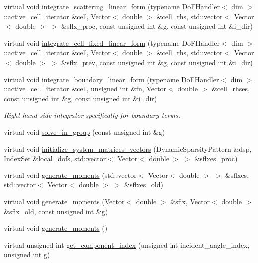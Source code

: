\begin{DoxyCompactItemize}
virtual void \hyperlink{class_equation_base_aca5998c1afd2b89ee93d3fbbfde7f3d0}{integrate\+\_\+scattering\+\_\+linear\+\_\+form} (typename Do\+F\+Handler$<$ dim $>$\+::active\+\_\+cell\+\_\+iterator \&cell, Vector$<$ double $>$ \&cell\+\_\+rhs, std\+::vector$<$ Vector$<$ double $>$ $>$ \&sflx\+\_\+proc, const unsigned int \&g, const unsigned int \&i\+\_\+dir)
\item 
virtual void \hyperlink{class_equation_base_ae8472f5c20d76c7d01e5660f8377887e}{integrate\+\_\+cell\+\_\+fixed\+\_\+linear\+\_\+form} (typename Do\+F\+Handler$<$ dim $>$\+::active\+\_\+cell\+\_\+iterator \&cell, Vector$<$ double $>$ \&cell\+\_\+rhs, std\+::vector$<$ Vector$<$ double $>$ $>$ \&sflx\+\_\+prev, const unsigned int \&g, const unsigned int \&i\+\_\+dir)
\item 
virtual void \hyperlink{class_equation_base_a1a213c4e21984bead9146e50be97077f}{integrate\+\_\+boundary\+\_\+linear\+\_\+form} (typename Do\+F\+Handler$<$ dim $>$\+::active\+\_\+cell\+\_\+iterator \&cell, unsigned int \&fn, Vector$<$ double $>$ \&cell\+\_\+rhses, const unsigned int \&g, const unsigned int \&i\+\_\+dir)
\begin{DoxyCompactList}\small\item\em Right hand side integrator specifically for boundary terms. \end{DoxyCompactList}\item 
virtual void \hyperlink{class_equation_base_a591282eb0ced01a7f22e29e7f0f44129}{solve\+\_\+in\+\_\+group} (const unsigned int \&g)
\item 
virtual void \hyperlink{class_equation_base_a25ff3b8e1a0c98dc5077e6afbac6606c}{initialize\+\_\+system\+\_\+matrices\+\_\+vectors} (Dynamic\+Sparsity\+Pattern \&dsp, Index\+Set \&local\+\_\+dofs, std\+::vector$<$ Vector$<$ double $>$ $>$ \&sflxes\+\_\+proc)
\item 
virtual void \hyperlink{class_equation_base_aa6ea21eec0c4e3e1dbb17da25b0633d3}{generate\+\_\+moments} (std\+::vector$<$ Vector$<$ double $>$ $>$ \&sflxes, std\+::vector$<$ Vector$<$ double $>$ $>$ \&sflxes\+\_\+old)
\item 
virtual void \hyperlink{class_equation_base_a893affe5706a8798bed68bb4ff531eec}{generate\+\_\+moments} (Vector$<$ double $>$ \&sflx, Vector$<$ double $>$ \&sflx\+\_\+old, const unsigned int \&g)
\item 
virtual void \hyperlink{class_equation_base_ab74a0a15d0d2a20022cafad8dd6f46aa}{generate\+\_\+moments} ()
\item 
virtual unsigned int \hyperlink{class_equation_base_a03a5a22088edb15689e0041dcc6d323c}{get\+\_\+component\+\_\+index} (unsigned int incident\+\_\+angle\+\_\+index, unsigned int g)

\end{DoxyCompactItemize}
